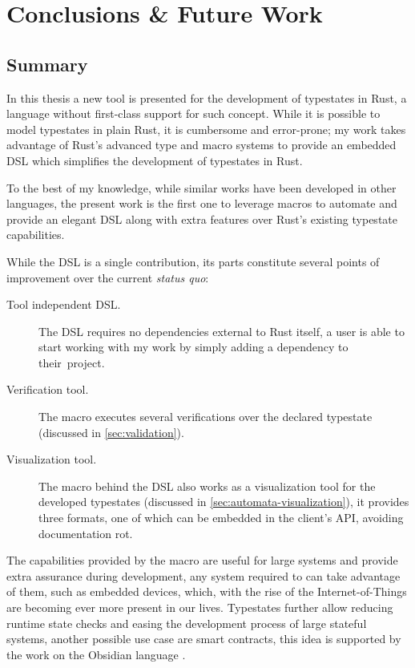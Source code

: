 

\chapter{Conclusions \& Future Work}\label{cha:conclusions}

\section{Summary}

In this thesis a new tool is presented for the development of typestates in Rust,
a language without first-class support for such concept.
While it is possible to model typestates in plain Rust, it is cumbersome and error-prone;
my work takes advantage of Rust's advanced type and macro systems
to provide an embedded DSL which simplifies the development of typestates in Rust.

To the best of my knowledge, while similar works have been developed in other languages,
the present work is the first one to leverage macros to automate
and provide an elegant DSL along with extra features over Rust's existing typestate capabilities.

While the DSL is a single contribution, its parts constitute several points of improvement over the current \emph{status quo}:
\begin{description}
    \item[Tool independent DSL.] The DSL requires no dependencies external to Rust itself,
    a user is able to start working with my work by simply adding a dependency to their~project.
    \item[Verification tool.] The macro executes several verifications over the declared typestate (discussed in \autoref{sec:validation}).
    \item[Visualization tool.] The macro behind the DSL also works as a visualization tool for the developed typestates (discussed in \autoref{sec:automata-visualization}),
    it provides three formats, one of which can be embedded in the client's API, avoiding documentation rot.
\end{description}

The capabilities provided by the macro are useful for large systems and provide extra assurance during development,
any system required to  can take advantage of them,
such as embedded devices, which, with the rise of the Internet-of-Things are becoming ever more present in our lives.
Typestates further allow reducing runtime state checks and easing the development process of large stateful systems,
another possible use case are smart contracts, this idea is supported by the work on the Obsidian language \autocite{Coblenz2020a, Coblenz2020}.

